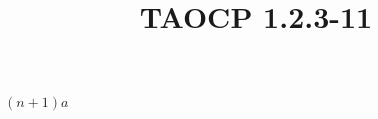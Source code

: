 \documentclass{article}
\title{TAOCP 1.2.3\mbox{-}11}
\begin{document}
\maketitle

\( (n+1)a \)
\end{document}
